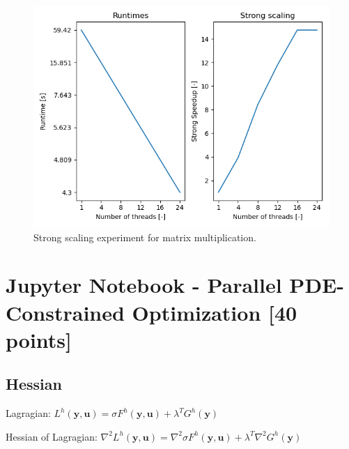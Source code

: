 \documentclass[unicode,11pt,a4paper,oneside,numbers=endperiod,openany]{scrartcl}
\begin{document}
\begin{figure}[H] 
  \centering                                                 
  \includegraphics[width=1\linewidth]{images/problem3.png}                     
  \caption{Strong scaling experiment for matrix multiplication.}                 
\end{figure}





\section{Jupyter Notebook - Parallel PDE-Constrained Optimization [40 points]}

\subsection{Hessian}
Lagragian: $L^h(\mathbf{y}, \mathbf{u}) = \sigma F^h(\mathbf{y}, \mathbf{u})
            + \lambda^T G^h(\mathbf{y})$

Hessian of Lagragian:
$\nabla^2 L^h(\mathbf{y}, \mathbf{u}) =\nabla^2 \sigma F^h(\mathbf{y}, \mathbf{u})
            + \lambda^T \nabla^2 G^h(\mathbf{y})$
\end{document}
